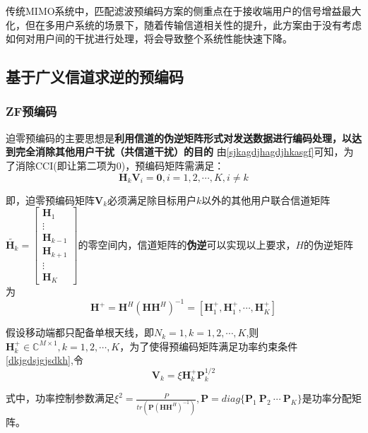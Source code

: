 传统MIMO系统中，匹配滤波预编码方案的侧重点在于接收端用户的信号增益最大化，但在多用户系统的场景下，随着传输信道相关性的提升，此方案由于没有考虑如何对用户间的干扰进行处理，将会导致整个系统性能快速下降。
\subsection{基于广义信道求逆的预编码}
\subsubsection{ZF预编码}
迫零预编码的主要思想是\textbf{利用信道的伪逆矩阵形式对发送数据进行编码处理，以达到完全消除其他用户干扰（共信道干扰）的目的}
由\ref{sjkagdjhagdjhkasgf}可知，为了消除CCI(即让第二项为0)，预编码矩阵需满足：
\begin{equation}
    \bm{H}_k\bm{V}_i=\bm{0},i=1,2,\cdots,K,i\neq k
\end{equation}\par 
即，迫零预编码矩阵$\bm{V}_k$必须满足除目标用户$k$以外的其他用户联合信道矩阵$\tilde{\bm{H}_k}=\begin{bmatrix}
    \bm{H}_1 \\
    \vdots   \\
    \bm{H}_{k-1} \\
    \bm{H}_{k+1} \\
    \vdots       \\
    \bm{H}_K
\end{bmatrix}$的零空间内，信道矩阵的\textbf{伪逆}可以实现以上要求，$H$的伪逆矩阵为
\begin{equation}
    \bm{H}^+=\bm{H}^H(\bm{H}\bm{H}^H)^{-1}=[\bm{H}^+_1,\bm{H}^+_1,\cdots,\bm{H}^+_K]
\end{equation}\par 
假设移动端都只配备单根天线，即$N_k=1,k=1,2,\cdots,K$,则$\bm{H}_k^+\in \mathbb{C}^{M\times 1},k=1,2,\cdots,K$，为了使得预编码矩阵满足功率约束条件\ref{dkjgdsjgjsdkh},令
\begin{equation}
    \bm{V}_k=\xi \bm{H}_k^+\bm{P}_k^{1/2}
\end{equation}\par 
式中，功率控制参数满足$\xi^2=\frac{P}{tr(\bm{P}(\bm{HH}^H)^{-1})},\bm{P}=diag\{\bm{P}_1\ \bm{P}_2\ \cdots \ \bm{P}_K\}$是功率分配矩阵。
